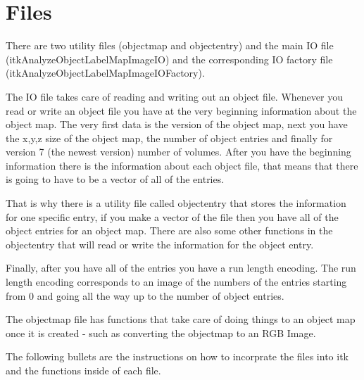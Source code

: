 \documentclass{InsightArticle}
\begin{document}
\section{Files}
There are two utility files (objectmap and objectentry) and the main IO file (itkAnalyzeObjectLabelMapImageIO) and the corresponding
IO factory file (itkAnalyzeObjectLabelMapImageIOFactory).  

The IO file takes care of reading and writing out an object file.  Whenever
you read or write an object file you have at the very beginning information about the object map.  The very first data is the version
of the object map, next you have the x,y,z size of the object map, the number of object entries and finally for version 7 (the newest
version) number of volumes.  After you have the beginning information there is the information about each object file, that means that
there is going to have to be a vector of all of the entries.  

That is why there is a utility file called objectentry that stores the
information for one specific entry, if you make a vector of the file then you have all of the object entries for an object map.  There
are also some other functions in the objectentry that will read or write the information for the object entry.  

Finally, after you have all of the entries you have a run length encoding.  The run length encoding corresponds to an image of the numbers of the entries starting from 0 and going all the way up to the number of object entries.  

The objectmap file has functions that take care of doing things to an object map once it is created - such as converting the objectmap to an RGB Image. 

The following bullets are the instructions on how to incorprate the files into itk and the functions inside of each file.
\end{document}
